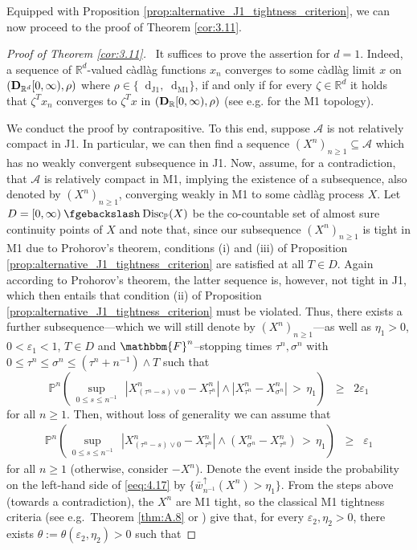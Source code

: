 \documentclass[11pt]{article}
\theoremstyle{definition}\newtheorem{example}[theorem]{Example}
\theoremstyle{definition}\newtheorem{counterexample}[theorem]{Counterexample}
\theoremstyle{definition}\newtheorem{remark}[theorem]{Remark}
\theoremstyle{definition}\newtheorem{defi}[theorem]{Definition}
\numberwithin{equation}{section}
\newcommand{\R}{\mathbb{R}}
\newcommand{\D}{{\bf D}}											%
\newcommand*\diff{\mathop{}\!\mathrm{d}}								%
\newcommand{\Pro}{\mathbb{P}}										%
\renewcommand{\sup}[1]{\underset{#1}{\operatorname{sup}}\;}					%
\renewcommand{\setminus}{\mathbin{\fgebackslash}}						%
\renewcommand{\|}{\; : \, \;}											%
\newcommand{\dJ}{\diff_{\operatorname{J1}}}								%
\newcommand{\dM}{\diff_{\operatorname{M1}}}							%
\begin{document}
Equipped with Proposition \ref{prop:alternative_J1_tightness_criterion}, we can now proceed to the proof of Theorem \ref{cor:3.11}.
\begin{proof}[Proof of Theorem \ref{cor:3.11}] \ 
	It suffices to prove the assertion for $d=1$. Indeed, a sequence of $\R^d$-valued càdlàg functions $x_n$ converges to some càdlàg limit $x$ on $(\D_{\R^d}[0,\infty), \rho)$ where $\rho \in \{\dJ, \dM\}$, if and only if for every $\zeta \in \R^d$ it holds that $\zeta^T x_n$ converges to $\zeta^T x$ in $(\D_{\R}[0,\infty), \rho)$ (see e.g. \cite[Thm.~12.7.2]{whitt} for the M1 topology).
	
	We conduct the proof by contrapositive. To this end, suppose $\mathcal{A}$ is not relatively compact in J1. In particular, we can then find a sequence $(X^n)_{n\ge 1} \subseteq \mathcal{A}$ which has no weakly convergent subsequence in J1. Now, assume, for a contradiction, that $\mathcal{A}$ is relatively compact in M1, implying the existence of a subsequence, also denoted by $(X^{n})_{n\ge 1}$, converging weakly in M1 to some càdlàg process $X$. Let $D= [0,\infty) \setminus \operatorname{Disc}_\Pro(X)$ be the co-countable set of almost sure continuity points of $X$ and note that, since our subsequence $(X^{n})_{n\ge 1}$ is tight in M1 due to Prohorov's theorem, conditions (i) and (iii) of Proposition \ref{prop:alternative_J1_tightness_criterion} are satisfied at all $T\in D$. Again according to Prohorov's theorem, the latter sequence is, however, not tight in J1, which then entails that condition (ii) of Proposition \ref{prop:alternative_J1_tightness_criterion} must be violated. Thus, there exists a further subsequence---which we will still denote by $(X^n)_{n\ge 1}$---as well as $\eta_1>0$, $0<\varepsilon_1 <1$, $T \in D$ and $\mathbbm{F}^n$--stopping times $\tau^n,\sigma^n$ with $0\le \tau^n\le \sigma^n\le (\tau^n+n^{-1})\wedge T$ such that 
	$$ \Pro^n\left( \, \sup{0\le s \le n^{-1}} \, |X^n_{(\tau^n-s)\vee 0}-X^n_{\tau^n}|\wedge |X^n_{\tau^n}-X^n_{\sigma^n}| \, > \, \eta_1 \right) \; \; \ge \; \; 2\varepsilon_1$$
	for all $n\ge 1$. Then, without loss of generality we can assume that
	\begin{align} \Pro^n\left( \, \sup{0\le s \le n^{-1}} \, |X^n_{(\tau^n-s)\vee 0}-X^n_{\tau^n}|\wedge (X^n_{\sigma^n}-X^n_{\tau^n}) \, > \, \eta_1 \right) \; \; \ge \; \; \varepsilon_1 \label{eeq:4.17} \end{align}
	for all $n\ge 1$ (otherwise, consider $-X^{n}$). Denote the event inside the probability on the left-hand side of \eqref{eeq:4.17} by $\{\bar w^{\uparrow}_{n^{-1}}(X^n) > \eta_1\}$. From the steps above (towards a contradiction), the $X^n$ are M1 tight, so the classical M1 tightness criteria (see e.g.~Theorem \ref{thm:A.8} or \cite[Thm.~12.12.3]{whitt}) give that, for every $\varepsilon_2, \eta_2>0$, there exists $\theta:=\theta(\varepsilon_2, \eta_2) >0$ such that

\end{proof}
\end{document}
